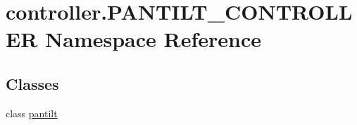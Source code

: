\hypertarget{namespacecontroller_1_1PANTILT__CONTROLLER}{}\section{controller.\+P\+A\+N\+T\+I\+L\+T\+\_\+\+C\+O\+N\+T\+R\+O\+L\+L\+E\+R Namespace Reference}
\label{namespacecontroller_1_1PANTILT__CONTROLLER}
\subsection*{Classes}
\begin{DoxyCompactItemize}
\item 
class \hyperlink{classcontroller_1_1PANTILT__CONTROLLER_1_1pantilt}{pantilt}
\end{DoxyCompactItemize}
